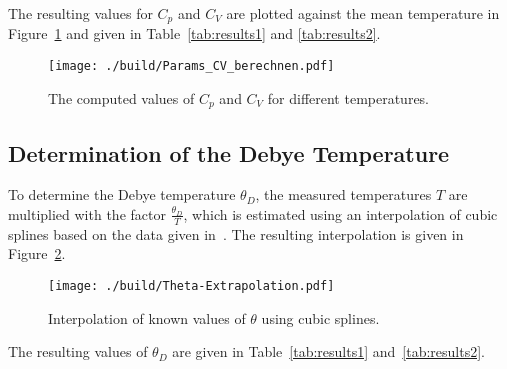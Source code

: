 \noindent
The resulting values for $C_{p}$ and $C_{V}$ are plotted against the mean temperature in Figure~\ref{fig:results} and given in
Table~\ref{tab:results1} and \ref{tab:results2}.
\begin{figure}[H]
	\centering
	\texttt{[image: ./build/Params\_CV\_berechnen.pdf]}
	\caption{The computed values of $C_{p}$ and $C_{V}$ for different temperatures.}
	\label{fig:results}
\end{figure}
\noindent

\subsection{Determination of the Debye Temperature}
To determine the Debye temperature $\theta_{D}$, the measured temperatures $T$ are multiplied with the factor $\frac{\theta_{D}}{T}$, which is estimated
using an interpolation of cubic splines based on the data given in~\cite{V47}. The resulting interpolation is given in Figure~\ref{fig:interpol2}.
\begin{figure}[H]
	\centering
	\texttt{[image: ./build/Theta-Extrapolation.pdf]}
	\caption{Interpolation of known values of $\theta$ using cubic splines.}
	\label{fig:interpol2}
\end{figure}
\noindent
The resulting values of $\theta_{D}$ are given in Table~\ref{tab:results1} and~\ref{tab:results2}.
